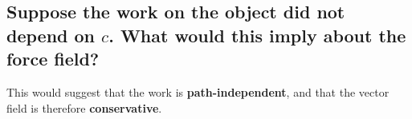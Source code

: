 \documentclass{article}
\begin{document}


\subsection{Suppose the work on the object did not depend on $c$.  What would this imply about the force field?}

\par\noindent\Large This would suggest that the work is \textbf{path-independent}, and that the vector field is therefore \textbf{conservative}.
\end{document}

